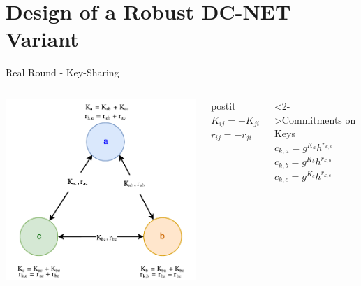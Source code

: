 \section{Design of a Robust DC-NET Variant}



\begin{frame}{Real Round - Key-Sharing}
    \begin{columns}[c]
            \hspace{-0.9cm}
            \includegraphics[scale=.6]{images/keys-sharing.pdf}
            \vspace{.2cm}
            \centering
            \begin{beamercolorbox}[sep=.5em,wd=3cm,center]{postit}
                $K_{ij} = -K_{ji}$\\
                $r_{ij} = -r_{ji}$
            \end{beamercolorbox}
            \begin{block}<2->{Commitments on Keys}
                \centering
                $c_{k,a} = g^{K_a} h^{r_{k,a}}$\\
                $c_{k,b} = g^{K_b} h^{r_{k,b}}$\\
                $c_{k,c} = g^{K_c} h^{r_{k,c}}$
            \end{block}

\end{columns}
\end{frame}
